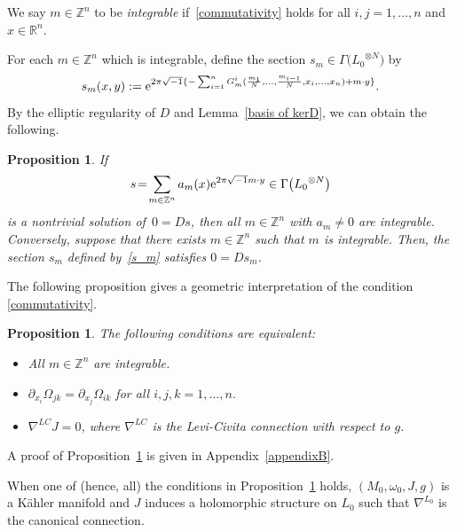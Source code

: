 \documentclass[10pt,a4paper]{amsart}
\numberwithin{equation}{section}
\newtheorem{Proposition}[Theorem]{Proposition}
 { \theoremstyle{definition}
\newtheorem{Definition}[Theorem]{Definition}
\newtheorem{Note}[Theorem]{Note}
\newtheorem{Example}[Theorem]{Example}
\newtheorem{Remark}[Theorem]{Remark} }
\newcommand{\R}{\mathbb{R}}
\newcommand{\Z}{\mathbb{Z}}
\begin{document}
\begin{Definition}
We say $m\in \Z^n$ to be \emph{integrable} if~\eqref{commutativity} holds for all $i, j=1,\ldots , n$ and $x\in \R^n$.
\end{Definition}

For each $m\in \Z^n$ which is integrable, define the section $s_m\in \Gamma\bigl({L_0}^{\otimes N}\bigr)$ by
\begin{equation}\label{s_m}
s_m(x,y):={\rm e}^{2\pi\sqrt{-1}\{-\sum_{i=1}^nG_m^i(\frac{m_1}{N},\ldots ,\frac{m_{i-1}}{N},x_i,\ldots ,x_n)+m\cdot y\}} .
\end{equation}
By the elliptic regularity of $D$ and Lemma~\ref{basis of kerD}, we can obtain the following.
\begin{Proposition}\label{existence condition}
If
\[
s\!=\!\sum_{m\in \Z^n}a_m(x){\rm e}^{2\pi\sqrt{-1}m\cdot y}\in \Gamma\bigl({L_0}^{\otimes N}\bigr)
\]
 is a nontrivial solution of~${0\!=\!Ds}$, then all $m\in \Z^n$ with $a_m\not=0$ are integrable. Conversely, suppose that there exists $m\in \Z^n$ such that $m$ is integrable. Then, the section $s_m$ defined by~\eqref{s_m}
satisfies $0=Ds_m$.
\end{Proposition}
%
The following proposition gives a geometric interpretation of the condition \eqref{commutativity}.
\begin{Proposition}\label{prop commutativity2}
The following conditions are equivalent:
\begin{itemize}\itemsep=0pt
\item[$(1$)] All $m\in \Z^n$ are integrable.
\item[$(2)$] $\partial_{x_i}\Omega_{jk}=\partial_{x_j}\Omega_{ik}$ for all $i, j, k=1,\ldots , n$.
\item[$(3)$] $\nabla^{LC} J=0$, where $\nabla^{LC}$ is the Levi-Civita connection with respect to $g$.
\end{itemize}
\end{Proposition}
A proof of Proposition~\ref{prop commutativity2} is given in Appendix~\ref{appendixB}.

\begin{Remark}\label{holomorphic structure}
When one of (hence, all) the conditions in Proposition~\ref{prop commutativity2} holds, $\left(M_0, \omega_0, J, g\right)$ is a K\"ahler manifold and $J$ induces a holomorphic structure on ${L_0}$ such that $\nabla^{L_0}$ is the canonical connection.
\end{Remark}


%
%
\end{document}
